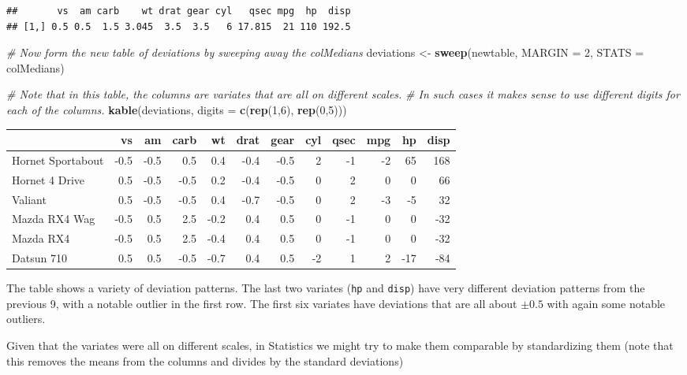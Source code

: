 \documentclass[]{article}
\newenvironment{Shaded}{\begin{snugshade}}{\end{snugshade}}
\newcommand{\KeywordTok}[1]{\textcolor[rgb]{0.13,0.29,0.53}{\textbf{#1}}}
\newcommand{\DataTypeTok}[1]{\textcolor[rgb]{0.13,0.29,0.53}{#1}}
\newcommand{\DecValTok}[1]{\textcolor[rgb]{0.00,0.00,0.81}{#1}}
\newcommand{\StringTok}[1]{\textcolor[rgb]{0.31,0.60,0.02}{#1}}
\newcommand{\CommentTok}[1]{\textcolor[rgb]{0.56,0.35,0.01}{\textit{#1}}}
\newcommand{\NormalTok}[1]{#1}
\begin{document}
\begin{verbatim}
##       vs  am carb    wt drat gear cyl   qsec mpg  hp  disp
## [1,] 0.5 0.5  1.5 3.045  3.5  3.5   6 17.815  21 110 192.5
\end{verbatim}

\begin{Shaded}
\begin{Highlighting}[]
\CommentTok{# Now form the new table of deviations by sweeping away the colMedians}
\NormalTok{deviations <-}\StringTok{ }\KeywordTok{sweep}\NormalTok{(newtable, }\DataTypeTok{MARGIN =} \DecValTok{2}\NormalTok{, }\DataTypeTok{STATS =}\NormalTok{ colMedians)}

\CommentTok{# Note that in this table, the columns are variates that are all on different scales.}
\CommentTok{# In such cases it makes sense to use different digits for each of the columns.}
\KeywordTok{kable}\NormalTok{(deviations, }\DataTypeTok{digits =} \KeywordTok{c}\NormalTok{(}\KeywordTok{rep}\NormalTok{(}\DecValTok{1}\NormalTok{,}\DecValTok{6}\NormalTok{), }\KeywordTok{rep}\NormalTok{(}\DecValTok{0}\NormalTok{,}\DecValTok{5}\NormalTok{)))}
\end{Highlighting}
\end{Shaded}

\begin{longtable}[]{@{}lrrrrrrrrrrr@{}}
\toprule
& vs & am & carb & wt & drat & gear & cyl & qsec & mpg & hp &
disp\tabularnewline
\midrule
\endhead
Hornet Sportabout & -0.5 & -0.5 & 0.5 & 0.4 & -0.4 & -0.5 & 2 & -1 & -2
& 65 & 168\tabularnewline
Hornet 4 Drive & 0.5 & -0.5 & -0.5 & 0.2 & -0.4 & -0.5 & 0 & 2 & 0 & 0 &
66\tabularnewline
Valiant & 0.5 & -0.5 & -0.5 & 0.4 & -0.7 & -0.5 & 0 & 2 & -3 & -5 &
32\tabularnewline
Mazda RX4 Wag & -0.5 & 0.5 & 2.5 & -0.2 & 0.4 & 0.5 & 0 & -1 & 0 & 0 &
-32\tabularnewline
Mazda RX4 & -0.5 & 0.5 & 2.5 & -0.4 & 0.4 & 0.5 & 0 & -1 & 0 & 0 &
-32\tabularnewline
Datsun 710 & 0.5 & 0.5 & -0.5 & -0.7 & 0.4 & 0.5 & -2 & 1 & 2 & -17 &
-84\tabularnewline
\bottomrule
\end{longtable}

The table shows a variety of deviation patterns. The last two variates
(\texttt{hp} and \texttt{disp}) have very different deviation patterns
from the previous 9, with a notable outlier in the first row. The first
six variates have deviations that are all about \(\pm 0.5\) with again
some notable outliers.

Given that the variates were all on different scales, in Statistics we
might try to make them comparable by standardizing them (note that this
removes the means from the columns and divides by the standard
deviations)
\end{document}

